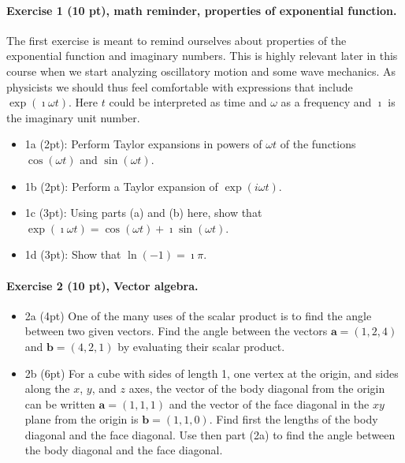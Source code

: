\documentclass[%
oneside,                 %
final,                   %
10pt]{article}
\begin{document}
\noindent
\paragraph{Exercise 1 (10 pt), math reminder, properties of exponential function.}
The first exercise is meant to remind ourselves about properties of
the exponential function and imaginary numbers. This is highly
relevant later in this course when we start analyzing oscillatory
motion and some wave mechanics. As physicists we should thus feel comfortable with expressions that
include $\exp{(\imath\omega t)}$. Here $t$ could be interpreted as time and $\omega$ as a frequency and $\imath$ is the imaginary unit number.

\begin{itemize}
\item 1a (2pt): Perform Taylor expansions in powers of $\omega t$ of the functions $\cos{(\omega t)}$ and $\sin{(\omega t)}$.

\item 1b (2pt): Perform a Taylor expansion of $\exp{(i\omega t)}$.

\item 1c (3pt): Using parts (a) and (b) here, show that $\exp{(\imath\omega t)}=\cos{(\omega t)}+\imath\sin{(\omega t)}$.

\item 1d (3pt): Show that $\ln{(−1)} = \imath\pi$.
\end{itemize}

\noindent
\paragraph{Exercise 2 (10 pt), Vector algebra.}
\begin{itemize}
\item 2a (4pt) One of the many uses of the scalar product is to find the angle between two given vectors. Find the angle between the vectors $\bm{a}=(1,2,4)$ and $\bm{b}=(4,2,1)$ by evaluating their scalar product.

\item 2b (6pt) For a cube with sides of length 1, one vertex at the origin, and sides along the $x$, $y$, and $z$ axes, the vector of the body diagonal from the origin can be written $\bm{a}=(1, 1, 1)$ and the vector of the face diagonal in the $xy$ plane from the origin is $\bm{b}=(1,1,0)$. Find first the lengths of the body diagonal and the face diagonal. Use then part (2a) to find the angle between the body diagonal and the face diagonal.
\end{itemize}
\end{document}
